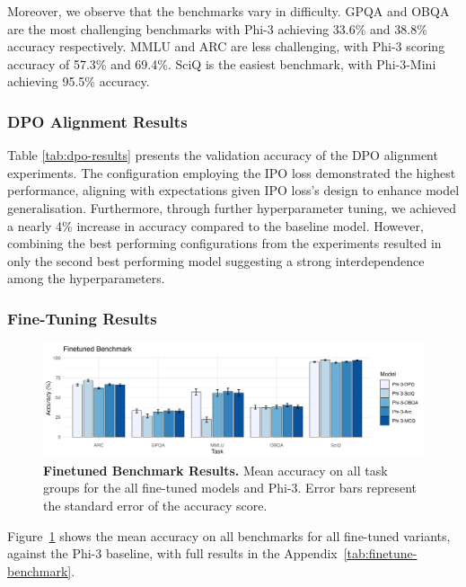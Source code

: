 Moreover, we observe that the benchmarks vary in difficulty. GPQA and OBQA are the most challenging benchmarks with Phi-3 achieving 33.6\% and 38.8\% accuracy respectively. MMLU and ARC are less challenging, with Phi-3 scoring accuracy of 57.3\% and 69.4\%. SciQ is the easiest benchmark, with Phi-3-Mini achieving 95.5\% accuracy.

\subsubsection{DPO Alignment Results}



Table \ref{tab:dpo-results} presents the validation accuracy of the DPO alignment experiments. The configuration employing the IPO loss demonstrated the highest performance, aligning with expectations given IPO loss's design to enhance model generalisation. Furthermore, through further hyperparameter tuning, we achieved a nearly 4\% increase in accuracy compared to the baseline model. However, combining the best performing configurations from the experiments resulted in only the second best performing model suggesting a strong interdependence among the hyperparameters.


\subsubsection{Fine-Tuning Results}
\begin{figure}
    \centering
    \includegraphics[width=\textwidth]{figures/finetuned-benchmark.png}
    \caption{\textbf{Finetuned Benchmark Results.} Mean accuracy on all task groups for the all fine-tuned models and Phi-3. Error bars represent the standard error of the accuracy score.}
    \label{fig:finetuned-benchmark}
\end{figure}

Figure~\ref{fig:finetuned-benchmark} shows the mean accuracy on all benchmarks
for all fine-tuned variants, against the Phi-3 baseline, with full results in the Appendix~\ref{tab:finetune-benchmark}. 

